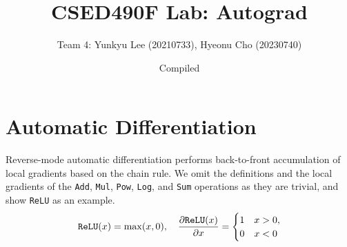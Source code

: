 \documentclass{lucas-report}
\title{CSED490F Lab: Autograd}
\author{Team 4: Yunkyu Lee (20210733), Hyeonu Cho (20230740)}
\date{Compiled \DTMNow}
\begin{document}
\maketitle

\section{Automatic Differentiation}\label{sec:autodiff}

Reverse-mode automatic differentiation performs
back-to-front accumulation of local gradients based on the chain rule.
%
%
We omit the definitions and the local gradients of the
\texttt{Add}, \texttt{Mul}, \texttt{Pow}, \texttt{Log}, and \texttt{Sum} operations as they are trivial,
and show \texttt{ReLU} as an example.
\[
  \texttt{ReLU}(x) = \max(x, 0),
  \quad \pdv{\texttt{ReLU}(x)}{x} =
  \begin{cases}
    1 & x > 0, \\
    0 & x < 0
  \end{cases}
\]
\end{document}
